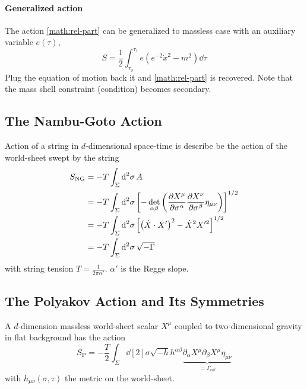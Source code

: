 \documentclass[12pt, a4paper, DIV=15]{article}
\numberwithin{equation}{section}
\begin{document}
\paragraph{Generalized action} The action \eqref{math:rel-part} can be generalized to massless case with an auxiliary variable $e(\tau)$,
\begin{equation}
	S = \frac{1}{2} \int_{\tau_0}^{\tau_1} e (e^{-2}\dot{x}^2 - m^2) \dd{\tau} 
\end{equation}
Plug the equation of motion back it and \eqref{math:rel-part} is recovered. Note that the mass shell constraint (condition) becomes secondary.

\subsection{The Nambu-Goto Action}
Action of a string in $d$-dimensional space-time is describe be the action of the world-sheet swept by the string
\begin{align}
	\begin{split}
		S_\text{NG} &= - T \int_{\Sigma} \dd[2]{\sigma} A \\
						&= - T \int_{\Sigma} \dd[2]{\sigma} \left[ - \det_{\alpha\beta} \left( \pdv{X^\mu}{\sigma^\alpha} \pdv{X^\nu}{\sigma^\beta} \eta_{\mu\nu} \right) \right]^{1/2} \\
						&= - T \int_{\Sigma} \dd[2]{\sigma} \left[ \left( \dot{X}\cdot X' \right)^2 - \dot{X}^2 X'^2 \right]^{1/2} \\
						&= - T \int_{\Sigma} \dd[2]{\sigma} \sqrt{-\Gamma}
	\end{split}
\end{align}
with string tension $T = \frac{1}{2\pi \alpha'}$. $\alpha'$ is the {Regge slope}.

\subsection{The Polyakov Action and Its Symmetries}
A $d$-dimension massless world-sheet scalar $X^\mu$ coupled to two-dimensional gravity in flat background has the action
\begin{equation}
	S_\text{P} = - \frac{T}{2} \int_{\Sigma} \dd[2]{\sigma} \sqrt{-h} h^{\alpha\beta} \underbrace{\partial_\alpha X^\mu \partial_\beta X^\mu \eta_{\mu\nu}}_{=\Gamma_{\alpha\beta}}
\end{equation}
with $h_{\mu\nu}(\sigma,\tau)$ the metric on the world-sheet.
\end{document}
